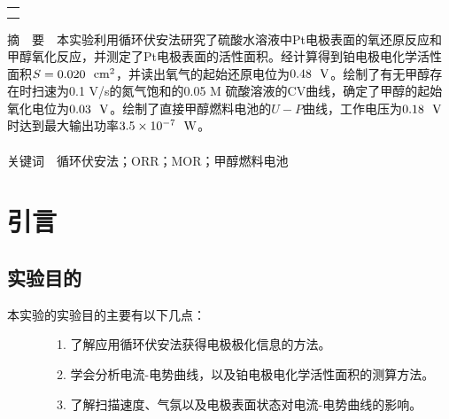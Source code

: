 \documentclass[12pt]{article}
\begin{document}
\begin{titlepage}
\begin{center}
            \begin{tabular*}{\textwidth}{c}
                \\ %
                \\ %
                \\ %
                \hline %
            \end{tabular*}
        \end{center}
        \textsf{\textcolor{BrickRed}{摘\ \ 要}}\ \ 本实验利用循环伏安法研究了硫酸水溶液中Pt电极表面的氧还原反应和甲醇氧化反应，并测定了Pt电极表面的活性面积。经计算得到铂电极电化学活性面积$S=0.020\ \ {\rm cm^{2}}$，并读出氧气的起始还原电位为$0.48\ \ {\rm V}$。绘制了有无甲醇存在时扫速为0.1 V/s的氮气饱和的0.05 M 硫酸溶液的CV曲线，确定了甲醇的起始氧化电位为$0.03\ \ {\rm V}$。绘制了直接甲醇燃料电池的$U-P$曲线，工作电压为$0.18\ \ {\rm V}$时达到最大输出功率$3.5\times 10^{-7}\ \ {\rm W}$。
        \\
        \\
        \textsf{\textcolor{BrickRed}{关键词}}\ \ 循环伏安法；ORR；MOR；甲醇燃料电池
    \end{titlepage}

    \section{引言}
		\subsection{实验目的}
			本实验的实验目的主要有以下几点\cite{physchemlab}：\par
			\ \ \ \ \ \ \ \ 1. 了解应用循环伏安法获得电极极化信息的方法。\par
			\ \ \ \ \ \ \ \	2. 学会分析电流-电势曲线，以及铂电极电化学活性面积的测算方法。\par
			\ \ \ \ \ \ \ \	3. 了解扫描速度、气氛以及电极表面状态对电流-电势曲线的影响。\par
\end{document}
